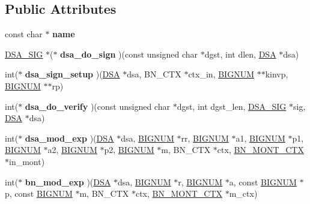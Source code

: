 \subsection*{Public Attributes}
\begin{DoxyCompactItemize}
\item 
\mbox{\label{structdsa__method_a83d504a9d8609d6172a7e4a824791933}} 
const char $\ast$ {\bfseries name}
\item 
\mbox{\label{structdsa__method_acac9dacfe7fd6637af11f0280ed087ad}} 
\hyperlink{structDSA__SIG__st}{D\+S\+A\+\_\+\+S\+IG} $\ast$($\ast$ {\bfseries dsa\+\_\+do\+\_\+sign} )(const unsigned char $\ast$dgst, int dlen, \hyperlink{structdsa__st}{D\+SA} $\ast$dsa)
\item 
\mbox{\label{structdsa__method_a6c731fb594e9d87b38351caf21b52f72}} 
int($\ast$ {\bfseries dsa\+\_\+sign\+\_\+setup} )(\hyperlink{structdsa__st}{D\+SA} $\ast$dsa, B\+N\+\_\+\+C\+TX $\ast$ctx\+\_\+in, \hyperlink{structbignum__st}{B\+I\+G\+N\+UM} $\ast$$\ast$kinvp, \hyperlink{structbignum__st}{B\+I\+G\+N\+UM} $\ast$$\ast$rp)
\item 
\mbox{\label{structdsa__method_a48d8dcf12cd14676633cde4b06dbe1c5}} 
int($\ast$ {\bfseries dsa\+\_\+do\+\_\+verify} )(const unsigned char $\ast$dgst, int dgst\+\_\+len, \hyperlink{structDSA__SIG__st}{D\+S\+A\+\_\+\+S\+IG} $\ast$sig, \hyperlink{structdsa__st}{D\+SA} $\ast$dsa)
\item 
\mbox{\label{structdsa__method_a6295bfda1f4be2fc9e04e69c6a104f4d}} 
int($\ast$ {\bfseries dsa\+\_\+mod\+\_\+exp} )(\hyperlink{structdsa__st}{D\+SA} $\ast$dsa, \hyperlink{structbignum__st}{B\+I\+G\+N\+UM} $\ast$rr, \hyperlink{structbignum__st}{B\+I\+G\+N\+UM} $\ast$a1, \hyperlink{structbignum__st}{B\+I\+G\+N\+UM} $\ast$p1, \hyperlink{structbignum__st}{B\+I\+G\+N\+UM} $\ast$a2, \hyperlink{structbignum__st}{B\+I\+G\+N\+UM} $\ast$p2, \hyperlink{structbignum__st}{B\+I\+G\+N\+UM} $\ast$m, B\+N\+\_\+\+C\+TX $\ast$ctx, \hyperlink{structbn__mont__ctx__st}{B\+N\+\_\+\+M\+O\+N\+T\+\_\+\+C\+TX} $\ast$in\+\_\+mont)
\item 
\mbox{\label{structdsa__method_afeec883c6d822b9faa7a03f2217fc651}} 
int($\ast$ {\bfseries bn\+\_\+mod\+\_\+exp} )(\hyperlink{structdsa__st}{D\+SA} $\ast$dsa, \hyperlink{structbignum__st}{B\+I\+G\+N\+UM} $\ast$r, \hyperlink{structbignum__st}{B\+I\+G\+N\+UM} $\ast$a, const \hyperlink{structbignum__st}{B\+I\+G\+N\+UM} $\ast$p, const \hyperlink{structbignum__st}{B\+I\+G\+N\+UM} $\ast$m, B\+N\+\_\+\+C\+TX $\ast$ctx, \hyperlink{structbn__mont__ctx__st}{B\+N\+\_\+\+M\+O\+N\+T\+\_\+\+C\+TX} $\ast$m\+\_\+ctx)

\end{DoxyCompactItemize}
